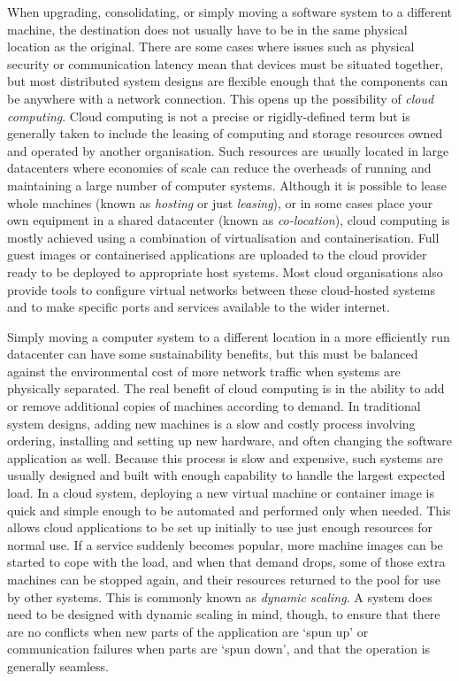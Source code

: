 When upgrading, consolidating, or simply moving a software system to a different machine, the destination does not usually have to be in the same physical location as the original. There are some cases where issues such as physical security or communication latency mean that devices must be situated together, but most distributed system designs are flexible enough that the components can be anywhere with a network connection. This opens up the possibility of \emph{\gls{cloud computing}}. Cloud computing is not a precise or rigidly-defined term but is generally taken to include the leasing of computing and storage resources owned and operated by another organisation. Such resources are usually located in large \gls{datacenter}s where economies of scale can reduce the overheads of running and maintaining a large number of computer systems. Although it is possible to lease whole machines (known as \emph{hosting} or just \emph{leasing}), or in some cases place your own equipment in a shared datacenter (known as \emph{co-location}), cloud computing is mostly achieved using a combination of \gls{virtualisation} and \gls{containerisation}. Full guest images or containerised applications are uploaded to the cloud provider ready to be deployed to appropriate host systems. Most cloud organisations also provide tools to configure virtual networks between these cloud-hosted systems and to make specific ports and services available to the wider internet.

Simply moving a computer system to a different location in a more efficiently run datacenter can have some sustainability benefits, but this must be balanced against the environmental cost of more network traffic when systems are physically separated. The real benefit of cloud computing is in the ability to add or remove additional copies of machines according to demand. In traditional system designs, adding new machines is a slow and costly process involving ordering, installing and setting up new hardware, and often changing the software application as well. Because this process is slow and expensive, such systems are usually designed and built with enough capability to handle the largest expected load. In a cloud system, deploying a new virtual machine or container image is quick and simple enough to be automated and performed only when needed. This allows cloud applications to be set up initially to use just enough resources for normal use. If a service suddenly becomes popular, more machine images can be started to cope with the load, and when that demand drops, some of those extra machines can be stopped again, and their resources returned to the pool for use by other systems. This is commonly known as \emph{\gls{dynamic scaling}}. A system does need to be designed with dynamic scaling in mind, though, to ensure that there are no conflicts when new parts of the application are `spun up' or communication failures when parts are `spun down', and that the operation is generally seamless.

